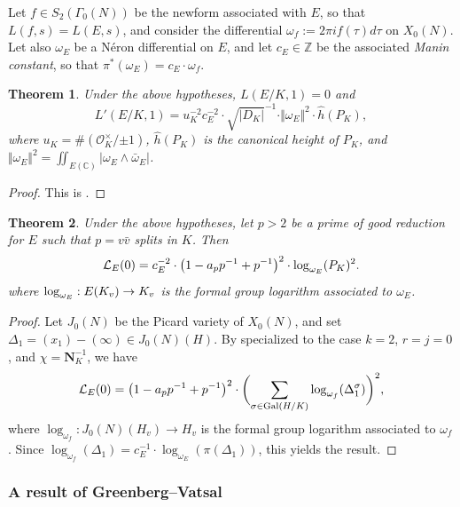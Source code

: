 \documentclass[10pt]{amsart}
\numberwithin{equation}{section}
\newtheorem{theorem}{Theorem}
\theoremstyle{definition}
\theoremstyle{remark}
\newcommand{\C}{\mathbb{C}}
\begin{document}
Let $f\in S_2(\Gamma_0(N))$ be the newform associated with $E$, so that $L(f,s)=L(E,s)$, and consider the differential $\omega_f:=2\pi i f(\tau)d\tau$ on $X_0(N)$. Let also $\omega_E$ be a N\'{e}ron differential on $E$, and let $c_E\in\mathbb{Z}$ be the associated \emph{Manin constant}, so that $\pi^*(\omega_E)=c_E\cdot\omega_f$.
  
\begin{theorem}
\label{thmGZ} 
Under the above hypotheses, $L(E/K,1)=0$ and 
\begin{displaymath}
L'(E/K,1)=u_K^{-2}c_E^{-2}\cdot\sqrt{\vert D_K\vert}^{-1}\cdot\Vert \omega_E \Vert^2\cdot \hat{h}(P_K),
\end{displaymath}
where $u_K=\#(\mathcal{O}_K^\times/{\pm{1}})$, %
$\hat{h}(P_K)$ is the canonical height of $P_K$, and $\Vert\omega_E\Vert^2=\iint_{E(\C)}|\omega_E \wedge \bar{\omega}_E|$. 
\end{theorem}

\begin{proof}
This is \cite[Thm.~V.2.1]{grosszagier}.
\end{proof}

\begin{theorem}
\label{thmpadicGZ} 
Under the above hypotheses, let $p>2$ be a prime of good reduction for $E$ such that $p=v\bar{v}$ splits in $K$. Then
\[
\mathcal{L}_E(0)=c_E^{-2}\cdot\bigl(1-a_pp^{-1}+p^{-1}\bigr)^2\cdot{\rm log}_{\omega_E}(P_K)^2.
\]
where ${\rm log}_{\omega_E}:E(K_v)\rightarrow K_v$ is the formal group logarithm associated to $\omega_E$.
\end{theorem}

\begin{proof}
Let $J_0(N)$ be the Picard variety of $X_0(N)$, and set $\Delta_1=(x_1)-(\infty)\in J_0(N)(H)$. 
By \cite[Thm.~5.13]{BDP} specialized to the case $k=2$, $r=j=0$, and $\chi=\mathbf{N}_K^{-1}$, we have
\[
\mathcal{L}_E(0)=\bigl(1-a_pp^{-1}+p^{-1}\bigr)^2\cdot\biggl(\sum_{\sigma\in{\rm Gal}(H/K)}\log_{\omega_f}(\Delta_1^\sigma)\biggr)^2,
\]
where $\log_{\omega_f}:J_0(N)(H_v)\rightarrow H_v$ is the formal group logarithm associated to $\omega_f$. Since $\log_{\omega_f}(\Delta_1)=%
c_E^{-1}\cdot\log_{\omega_E}(\pi(\Delta_1))$, this yields the result.
\end{proof}



\subsubsection{A result of Greenberg--Vatsal}
\end{document}
